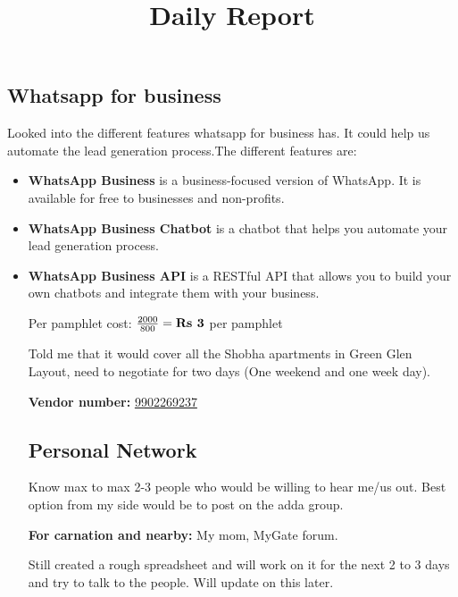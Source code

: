 \documentclass[12pt, a4paper]{article}
\begin{document}
\title{Daily Report}
\maketitle

\subsection{Whatsapp for business}

Looked into the different features whatsapp for business has. It could help us automate the lead generation process.The different features are:

\begin{itemize}
\item \textbf{WhatsApp Business} is a business-focused version of WhatsApp. It is available for free to businesses and non-profits.
\item \textbf{WhatsApp Business Chatbot} is a chatbot that helps you automate your lead generation process.
\item \textbf{WhatsApp Business API} is a RESTful API that allows you to build your own chatbots and integrate them with your business.


\vspace{0.5cm}

Per pamphlet cost: $\frac{2000}{800} = \textbf{Rs \the\numexpr 2000 / 800 \relax} $ per pamphlet

\bigskip

\noindent Told me that it would cover all the Shobha apartments in Green Glen Layout, need to negotiate for two days (One weekend and one week day).

\bigskip

\textbf{Vendor number:} \href{tel:+919902269237}{9902269237}

\subsection{Personal Network}

Know max to max 2-3 people who would be willing to hear me/us out. Best option from my side would be to post on the adda group.

\vspace{0.25cm}

\noindent \textbf{For carnation and nearby:} My mom, MyGate forum.

\vspace{0.25cm}

\noindent Still created a rough spreadsheet and will work on it for the next 2 to 3 days and try to talk to the people. Will update on this later.


\end{itemize}
\end{document}
